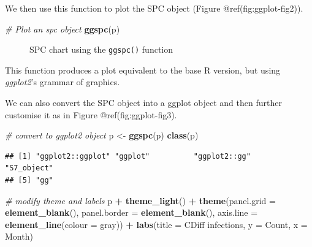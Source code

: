 \documentclass[
]{book}
\makeatletter
\newenvironment{Shaded}{\begin{snugshade}}{\end{snugshade}}
\newcommand{\AttributeTok}[1]{\textcolor[rgb]{0.13,0.29,0.53}{#1}}
\newcommand{\CommentTok}[1]{\textcolor[rgb]{0.56,0.35,0.01}{\textit{#1}}}
\newcommand{\FunctionTok}[1]{\textcolor[rgb]{0.13,0.29,0.53}{\textbf{#1}}}
\newcommand{\NormalTok}[1]{#1}
\newcommand{\OtherTok}[1]{\textcolor[rgb]{0.56,0.35,0.01}{#1}}
\newcommand{\SpecialCharTok}[1]{\textcolor[rgb]{0.81,0.36,0.00}{\textbf{#1}}}
\newcommand{\StringTok}[1]{\textcolor[rgb]{0.31,0.60,0.02}{#1}}
\newcommand*\pandocbounded[1]{%
  \sbox\pandoc@box{#1}%
  \Gscale@div\@tempa{\textheight}{\dimexpr\ht\pandoc@box+\dp\pandoc@box\relax}%
  \Gscale@div\@tempb{\linewidth}{\wd\pandoc@box}%
  \ifdim\@tempb\p@<\@tempa\p@\let\@tempa\@tempb\fi%
  \ifdim\@tempa\p@<\p@\scalebox{\@tempa}{\usebox\pandoc@box}%
  \else\usebox{\pandoc@box}%
  \fi%
}
\makeatother
\begin{document}
We then use this function to plot the SPC object (Figure
@ref(fig:ggplot-fig2)).

\begin{Shaded}
\begin{Highlighting}[]
\CommentTok{\# Plot an spc object}
\FunctionTok{ggspc}\NormalTok{(p)}
\end{Highlighting}
\end{Shaded}

\begin{figure}
\centering
\pandocbounded{}
\caption{SPC chart using the \protect\texttt{ggspc()} function}
\end{figure}

This function produces a plot equivalent to the base R version, but
using \emph{ggplot2}'s grammar of graphics.

We can also convert the SPC object into a ggplot object and then further
customise it as in Figure @ref(fig:ggplot-fig3).

\begin{Shaded}
\begin{Highlighting}[]
\CommentTok{\# convert to ggplot2 object}
\NormalTok{p }\OtherTok{\textless{}{-}} \FunctionTok{ggspc}\NormalTok{(p)}
\FunctionTok{class}\NormalTok{(p)}
\end{Highlighting}
\end{Shaded}

\begin{verbatim}
## [1] "ggplot2::ggplot" "ggplot"          "ggplot2::gg"     "S7_object"      
## [5] "gg"
\end{verbatim}

\begin{Shaded}
\begin{Highlighting}[]
\CommentTok{\# modify theme and labels}
\NormalTok{p }\SpecialCharTok{+}
  \FunctionTok{theme\_light}\NormalTok{() }\SpecialCharTok{+}
  \FunctionTok{theme}\NormalTok{(}\AttributeTok{panel.grid   =} \FunctionTok{element\_blank}\NormalTok{(),}
        \AttributeTok{panel.border =} \FunctionTok{element\_blank}\NormalTok{(),}
        \AttributeTok{axis.line    =} \FunctionTok{element\_line}\NormalTok{(}\AttributeTok{colour =} \StringTok{\textquotesingle{}gray\textquotesingle{}}\NormalTok{)) }\SpecialCharTok{+}
  \FunctionTok{labs}\NormalTok{(}\AttributeTok{title =} \StringTok{\textquotesingle{}CDiff infections\textquotesingle{}}\NormalTok{,}
       \AttributeTok{y     =} \StringTok{\textquotesingle{}Count\textquotesingle{}}\NormalTok{,}
       \AttributeTok{x     =} \StringTok{\textquotesingle{}Month\textquotesingle{}}\NormalTok{)}
\end{Highlighting}
\end{Shaded}
\end{document}
